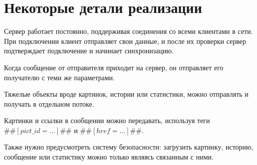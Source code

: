 \documentclass[a4paper,12pt]{extarticle}
\begin{document}
	\section{Некоторые детали реализации}
	Сервер работает постоянно, поддерживая соединения со всеми клиентами в сети. При подключении клиент отправляет свои данные, и после их проверки сервер подтверждает подключение и начинает синхронизацию.
	
	Когда сообщение от отправителя приходит на сервер, он отправляет его получателю с теми же параметрами.
	
	Тяжелые объекты вроде картинок, истории или статистики, можно отправлять и получать в отдельном потоке.
	
	Картинки и ссылки в сообщении можно передавать, используя теги 
	$\#\#[pict\_id = \dots]\#\#$ и $\#\#[href = \dots]\#\#$.
	
	Также нужно предусмотреть систему безопасности: загрузить картинку, историю, сообщение или статистику можно только являясь связанным с ними.
	
		
\end{document}
